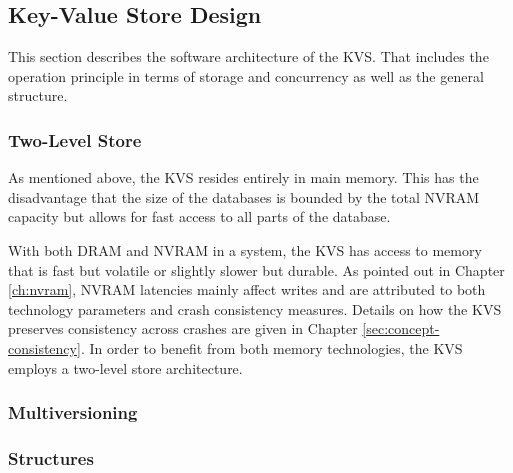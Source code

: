 \subsection{Key-Value Store Design}

This section describes the software architecture of the KVS. That includes the
operation principle in terms of storage and concurrency as well as the general
structure.

\subsubsection{Two-Level Store}

As mentioned above, the KVS resides entirely in main memory. This has the
disadvantage that the size of the databases is bounded by the total NVRAM
capacity but allows for fast access to all parts of the database.

With both DRAM and NVRAM in a system, the KVS has access to memory that is fast
but volatile or slightly slower but durable. As pointed out in Chapter
\ref{ch:nvram}, NVRAM latencies mainly affect writes and are attributed to both
technology parameters and crash consistency measures. Details on how the KVS
preserves consistency across crashes are given in Chapter
\ref{sec:concept-consistency}. In order to benefit from both memory
technologies, the KVS employs a two-level store architecture.

\subsubsection{Multiversioning}

\subsubsection{Structures}
